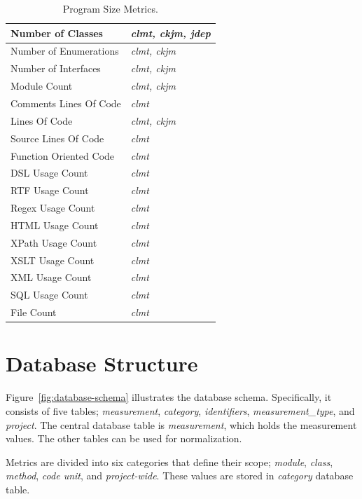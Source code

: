 \documentclass[conference]{IEEEtran}
\begin{document}
\begin{table}[!t]
\caption{Program Size Metrics.}
\label{tbl:size-selected-metrics}
\centering
\begin{tabular}{|l||l|}
 \hline
Number of Classes & \textit{clmt, ckjm, jdep}\\
\hline
Number of Enumerations & \textit{clmt, ckjm}\\
\hline
Number of Interfaces & \textit{clmt, ckjm}\\
\hline
Module Count & \textit{clmt, ckjm}\\
\hline
Comments Lines Of Code & \textit{clmt}\\
\hline
Lines Of Code & \textit{clmt, ckjm}\\
\hline
Source Lines Of Code & \textit{clmt}\\
\hline
Function Oriented Code & \textit{clmt}\\
\hline
DSL Usage Count & \textit{clmt}\\
\hline
RTF Usage Count & \textit{clmt}\\
\hline
Regex Usage Count & \textit{clmt}\\
\hline
HTML Usage Count & \textit{clmt}\\
\hline
XPath Usage Count & \textit{clmt}\\
\hline
XSLT Usage Count & \textit{clmt}\\
\hline
XML Usage Count & \textit{clmt}\\
\hline
SQL Usage Count & \textit{clmt}\\
\hline
File Count & \textit{clmt}\\
\hline
\end{tabular}
\end{table}

\section{Database Structure}
\label{sec:db}

Figure~\ref{fig:database-schema} illustrates the database schema. Specifically, it consists of five tables; \textit{measurement}, \textit{category}, \textit{identifiers}, \textit{measurement\_type}, and \textit{project}. The central database table is \textit{measurement}, which holds the measurement values. The other tables can be used for normalization.

Metrics are divided into six categories that define their scope; \textit{module}, \textit{class}, \textit{method}, \textit{code unit}, and \textit{project-wide}. These values are stored in \textit{category} database table.
\end{document}
